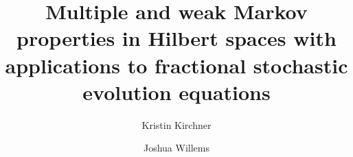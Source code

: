 \documentclass[reqno]{amsart}
\numberwithin{equation}{section}
\theoremstyle{remark}
\theoremstyle{definition}
\begin{document}
\author{Kristin Kirchner \and Joshua Willems}

\address[Kristin Kirchner]{Delft Institute of Applied Mathematics\\
	Delft University of Technology\\
	P.O.~Box 5031 \\ 
	2600 GA Delft \\
	The Netherlands.}


\address[Joshua Willems]{Delft Institute of Applied Mathematics\\
	Delft University of Technology\\
	P.O.~Box 5031 \\ 
	2600 GA Delft \\
	The Netherlands.}



\title[Multiple and weak Markov properties in Hilbert spaces]{%
	Multiple and weak Markov properties in Hilbert spaces with applications to fractional stochastic evolution equations}




\date{}

\end{document}
